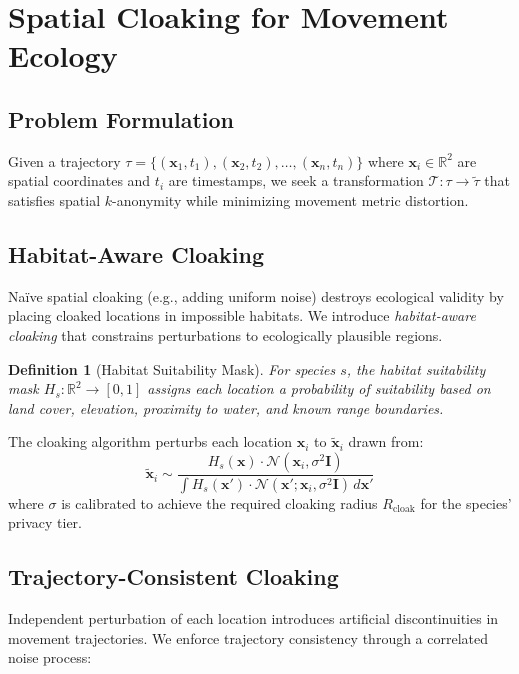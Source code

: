 \documentclass[11pt,letterpaper]{article}
\newtheorem{definition}{Definition}[section]
\begin{document}
\section{Spatial Cloaking for Movement Ecology}

\subsection{Problem Formulation}

Given a trajectory $\tau = \{(\mathbf{x}_1, t_1), (\mathbf{x}_2, t_2), \ldots, (\mathbf{x}_n, t_n)\}$ where $\mathbf{x}_i \in \mathbb{R}^2$ are spatial coordinates and $t_i$ are timestamps, we seek a transformation $\mathcal{T}: \tau \to \tilde{\tau}$ that satisfies spatial $k$-anonymity while minimizing movement metric distortion.

\subsection{Habitat-Aware Cloaking}

Na\"ive spatial cloaking (e.g., adding uniform noise) destroys ecological validity by placing cloaked locations in impossible habitats. We introduce \emph{habitat-aware cloaking} that constrains perturbations to ecologically plausible regions.

\begin{definition}[Habitat Suitability Mask]
For species $s$, the habitat suitability mask $H_s: \mathbb{R}^2 \to [0, 1]$ assigns each location a probability of suitability based on land cover, elevation, proximity to water, and known range boundaries.
\end{definition}

The cloaking algorithm perturbs each location $\mathbf{x}_i$ to $\tilde{\mathbf{x}}_i$ drawn from:
\begin{equation}
\tilde{\mathbf{x}}_i \sim \frac{H_s(\mathbf{x}) \cdot \mathcal{N}(\mathbf{x}_i, \sigma^2 \mathbf{I})}{\int H_s(\mathbf{x}') \cdot \mathcal{N}(\mathbf{x}'; \mathbf{x}_i, \sigma^2 \mathbf{I}) \, d\mathbf{x}'}
\end{equation}
where $\sigma$ is calibrated to achieve the required cloaking radius $R_{\text{cloak}}$ for the species' privacy tier.

\subsection{Trajectory-Consistent Cloaking}

Independent perturbation of each location introduces artificial discontinuities in movement trajectories. We enforce trajectory consistency through a correlated noise process:
\end{document}
